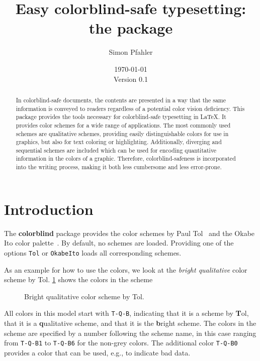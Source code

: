 \documentclass{scrartcl}
\title{Easy colorblind-safe typesetting:\\ the \colorblind package}
\author{Simon Pfahler}
\date{\today\\Version 0.1}
\newcommand\colorblind{\textbf{colorblind} }
\newcommand\marg[1]{\leavevmode\marginpar{\raggedleft #1}}
\begin{document}
\maketitle

\begin{abstract}
    In colorblind-safe documents, the contents are presented in a way that the same information is conveyed to readers regardless of a potential color vision deficiency.
    This package provides the tools necessary for colorblind-safe typesetting in \LaTeX.
    It provides color schemes for a wide range of applications.
    The most commonly used schemes are qualitative schemes, providing easily distinguishable colors for use in graphics, but also for text coloring or highlighting.
    Additionally, diverging and sequential schemes are included which can be used for encoding quantitative information in the colors of a graphic.
    Therefore, colorblind-safeness is incorporated into the writing process, making it both less cumbersome and less error-prone.
\end{abstract}

\tableofcontents
\clearpage

\section{Introduction}
\cprotect\marg{\verb!Tol!\\\verb!OkabeIto!}%
The \colorblind package provides the color schemes by Paul Tol~\cite{Tol} and the Okabe Ito color palette~\cite{Ichihara_2008}.
By default, no schemes are loaded.
Providing one of the options \verb!Tol! or \verb!OkabeIto! loads all corresponding schemes.

As an example for how to use the colors, we look at the \emph{bright qualitative} color scheme by Tol.
\cref{fig:T-Q-Bexample} shows the colors in the scheme

\begin{figure}[ht]
    \centering
    \caption{Bright qualitative color scheme by Tol.}
    \label{fig:T-Q-Bexample}
\end{figure}

All colors in this model start with \verb!T-Q-B!, indicating that it is a scheme by \textbf{T}ol, that it is a \textbf{q}ualitative scheme, and that it is the \textbf{b}right scheme.
The colors in the scheme are specified by a number following the scheme name, in this case ranging from \verb!T-Q-B1! to \verb!T-Q-B6! for the non-grey colors.
The additional color \verb!T-Q-B0! provides a color that can be used, e.g., to indicate bad data.
\end{document}
